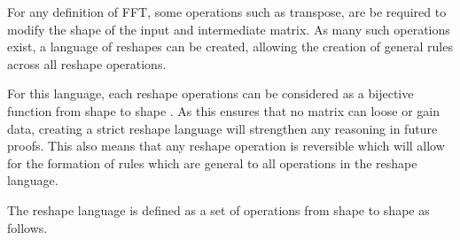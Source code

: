 For any definition of FFT, some operations such as transpose, are be required 
to modify the shape of the input and intermediate matrix.
As many such operations exist, a language of reshapes can be created, allowing
the creation of general rules across all reshape operations.

For this language, each reshape operations can be considered as a bijective function
from shape  to shape . 
As this ensures that no matrix can loose or gain data, creating a strict reshape 
language will strengthen any reasoning in future proofs.
This also means that any reshape operation is reversible which will allow for the
formation of rules which are general to all operations in the reshape language.

The reshape language is defined as a set of operations from shape to shape as follows.
